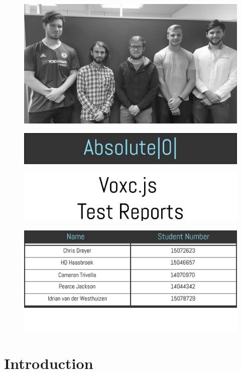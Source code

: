 \documentclass[english]{article}
\begin{document}
	
	
	\begin{figure}[H]
		\includegraphics[width=\linewidth]{teamphoto.jpg}
	\end{figure}

	\begin{figure}[H]
		\includegraphics[width=\linewidth]{teamtitle.jpg}
	\end{figure}

	\begin{figure}[H]
		\includegraphics[width=\linewidth]{documenttitle.jpg}
	\end{figure}

	\begin{figure}[H]
		\includegraphics[width=\linewidth]{teamtable.jpg}
	\end{figure}
	
	\newpage
	\tableofcontents
	
	\newpage

	\section{Introduction}
	
\end{document}
